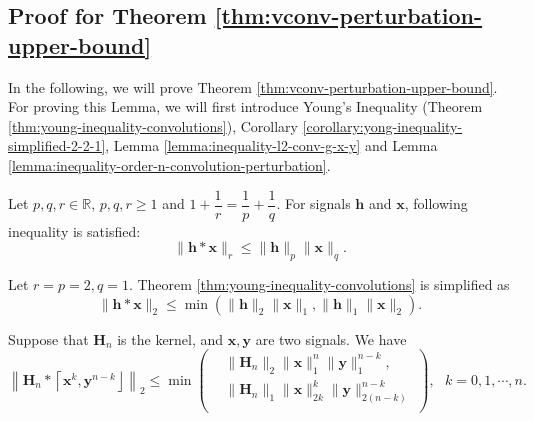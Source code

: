 \documentclass[twoside,11pt]{article}
\def\tvar#1{\mathbf{#1}} %
\def\lcerfl#1{\left\lceil{#1}\right\rfloor}
\begin{document}
\subsection{Proof for Theorem \ref{thm:vconv-perturbation-upper-bound}}
\label{subsec:proof-for-theorem-nn-is-robust-and-fragile}

In the following, we will prove Theorem \ref{thm:vconv-perturbation-upper-bound}.
For proving this Lemma, we will first introduce Young's Inequality (Theorem \ref{thm:young-inequality-convolutions}), Corollary \ref{corollary:yong-inequality-simplified-2-2-1}, Lemma \ref{lemma:inequality-l2-conv-g-x-y} and Lemma \ref{lemma:inequality-order-n-convolution-perturbation}.

\begin{theorem}
  Let \(p,q,r \in \mathbb{R}\), \(p,q,r \ge 1\) and \(1 + \dfrac{1}{r} = \dfrac{1}{p} + \dfrac{1}{q}\).
  For signals \(\tvar{h}\) and \(\tvar{x}\), following inequality is satisfied:
  \begin{equation}
    \| \tvar{h} * \tvar{x} \|_{r} \le \| \tvar{h} \|_{p} \| \tvar{x} \|_{q}.
  \end{equation}
  \label{thm:young-inequality-convolutions}
\end{theorem}

\begin{corollary}
  Let \(r = p = 2, q = 1\). Theorem \ref{thm:young-inequality-convolutions} is simplified as
  \begin{equation}
    \| \tvar{h} * \tvar{x} \|_{2} \le \min\left(
    \| \tvar{h} \|_{2} \| \tvar{x} \|_{1},
    \| \tvar{h} \|_{1} \| \tvar{x} \|_{2}
    \right).
  \end{equation}
  \label{corollary:yong-inequality-simplified-2-2-1}
\end{corollary}


\begin{lemma}
  Suppose that \(\tvar{H}_n\) is the kernel, and \(\tvar{x}, \tvar{y}\) are two signals. We have
    \begin{equation*}
      \left\|\tvar{H}_n * \lcerfl{\tvar{x}^k, \tvar{y}^{n-k}} \right\|_2
      \le \min\left(\begin{aligned}
           & \| \tvar{H}_n \|_2 \| \tvar{x} \|_1^n \| \tvar{y} \|_1^{n-k},          \\
           & \| \tvar{H}_n \|_1 \| \tvar{x} \|_{2k}^k \| \tvar{y} \|_{2(n-k)}^{n-k} \\
        \end{aligned}\right),
      ~~~ k = 0, 1, \cdots, n.
    \end{equation*}
  
  \label{lemma:inequality-l2-conv-g-x-y}
\end{lemma}
\end{document}
